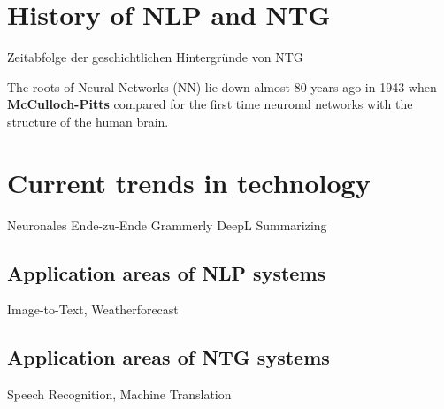 \section{History of NLP and NTG}\label{ss:history}

Zeitabfolge der geschichtlichen Hintergründe von NTG 

The roots of Neural Networks (NN) lie down almost 80 years ago in 1943 when \textbf{McCulloch-Pitts} \cite{NN} compared for the first time neuronal networks with the structure of the human brain. 

\section{Current trends in technology}\label{ss:trends}

Neuronales Ende-zu-Ende
Grammerly
DeepL
Summarizing

\subsection{Application areas of NLP systems}
Image-to-Text, Weatherforecast

\subsection{Application areas of NTG systems}
Speech Recognition, Machine Translation